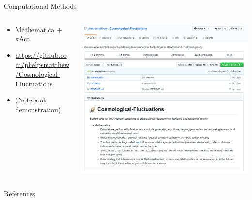 \documentclass[8pt,aspectratio=1610]{beamer}
\begin{document}
\begin{frame}{Computational Methods}
	\begin{columns}
		\hspace{3mm}\begin{column}{0.5\linewidth}
			\begin{itemize}
				\item Mathematica + xAct
				\item \url{https://github.com/phelpsmatthew/Cosmological-Fluctuations}
				\item (Notebook demonstration)
			\end{itemize}
		\end{column}
		\begin{column}{0.6\linewidth}
			\includegraphics[width=\linewidth]{github.png}
		\end{column}
	\end{columns}
\end{frame}


\begin{frame}{References}
		
\end{frame}

\end{document}
